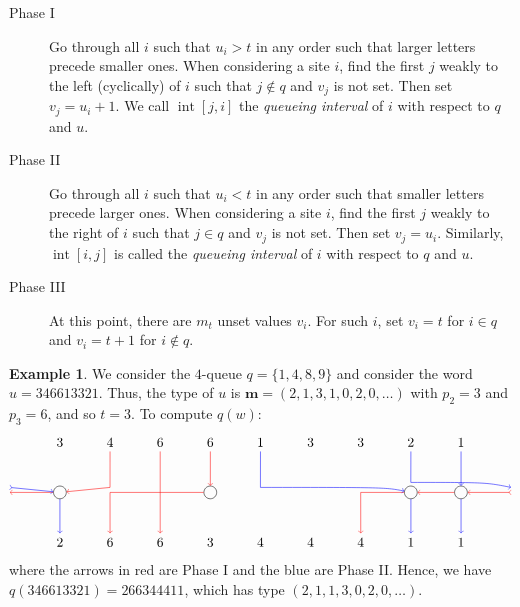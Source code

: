 \documentclass[submission]{FPSAC2018}
\newcommand{\0}{\phantom{c}}
\DeclareMathOperator{\inter}{int} %
\newcommand{\mm}{\mathbf{m}}
\newcommand{\defn}[1]{{\color{darkred}\emph{#1}}} %
\theoremstyle{plain}
\theoremstyle{definition}
\newtheorem{example}[thm]{Example}
\numberwithin{equation}{section}
\begin{document}
\begin{description}
\item[Phase I]
  Go through all $i$ such that $u_i > t$ in any order such that larger letters precede smaller ones.
  When considering a site $i$, find the first $j$ weakly to the left (cyclically) of $i$ such that $j \notin q$ and $v_j$ is not set. Then set $v_j = u_i + 1$. We call $\inter[j,i]$ the \defn{queueing interval} of $i$ with respect to $q$ and $u$.

\item[Phase II]
  Go through all $i$ such that $u_i < t$ in any order such that smaller letters precede larger ones.
  When considering a site $i$, find the first $j$ weakly to the right of $i$ such that $j \in q$ and $v_j$ is not set. Then set $v_j = u_i$. Similarly, $\inter[i,j]$ is called the \defn{queueing interval} of $i$ with respect to $q$ and $u$.

\item[Phase III]
  At this point, there are $m_t$ unset values $v_i$. For such $i$, set $v_i = t$ for $i \in q$ and $v_i = t+1$ for $i\notin q$.
\end{description}

\begin{example}
We consider the $4$-queue $q = \{1, 4, 8, 9\}$ and consider the word $u = 346613321$. Thus, the type of $u$ is $\mm = (2, 1, 3, 1, 0, 2, 0, \ldots)$ with $p_2 = 3$ and $p_3 = 6$, and so $t = 3$. To compute $q(w)$:
\[
\begin{tikzpicture}[scale=1.3]
\node (i1) at (1,1) {$3$};
\node (i2) at (2,1) {$4$};
\node (i3) at (3,1) {$6$};
\node (i4) at (4,1) {$6$};
\node (i5) at (5,1) {$1$};
\node (i6) at (6,1) {$3$};
\node (i7) at (7,1) {$3$};
\node (i8) at (8,1) {$2$};
\node (i9) at (9,1) {$1$};
\node (t1) at (1,-1) {$2$};
\node (t2) at (2,-1) {$6$};
\node (t3) at (3,-1) {$6$};
\node (t4) at (4,-1) {$3$};
\node (t5) at (5,-1) {$4$};
\node (t6) at (6,-1) {$4$};
\node (t7) at (7,-1) {$4$};
\node (t8) at (8,-1) {$1$};
\node (t9) at (9,-1) {$1$};
\node[circle,draw=black] (q1) at (1,0) {};
\node[circle,draw=black] (q2) at (4,0) {};
\node[circle,draw=black] (q3) at (8,0) {};
\node[circle,draw=black] (q4) at (9,0) {};
\draw[->,red] (i4) -- (q2);
\draw[->,red] (q2) -- (2,0) -- (t2);
\draw[->,red] (i3) -- (t3);
\draw[->,red] (i2) -- (2,0.1) -- (q1);
\draw[->,red] (q1) -- (0,0);
\draw[>->,red] (10,0) -- (q4);
\draw[->,red] (q4) -- (q3);
\draw[->,red] (q3) -- (7,0) -- (t7);
\draw[->,blue] (i5) -- (5,0.1) .. controls (7.5,0.1) .. (q3);
\draw[->,blue] (q3) -- (t8);
\draw[->,blue] (i9) -- (q4);
\draw[->,blue] (q4) -- (t9);
\draw[->,blue] (i8) -- (8,0.2) .. controls (9.5,0.2) .. (10,0.1);
\draw[>->,blue] (0,0.1) -- (q1);
\draw[->,blue] (q1) -- (t1);
\end{tikzpicture}
\]
where the arrows in red are Phase I and the blue are Phase II. Hence, we have $q(346613321) = 266344411$, which has type $(2,1,1,3,0,2,0,\ldots)$.
\end{example}
\end{document}
